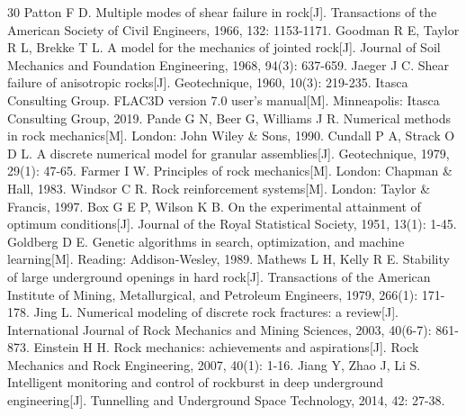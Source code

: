 \documentclass[twocolumn,a4paper,10pt]{article}
\begin{document}
\begin{thebibliography}{30}
 Patton F D. Multiple modes of shear failure in rock[J]. Transactions of the American Society of Civil Engineers, 1966, 132: 1153-1171.
 Goodman R E, Taylor R L, Brekke T L. A model for the mechanics of jointed rock[J]. Journal of Soil Mechanics and Foundation Engineering, 1968, 94(3): 637-659.
 Jaeger J C. Shear failure of anisotropic rocks[J]. Geotechnique, 1960, 10(3): 219-235.
 Itasca Consulting Group. FLAC3D version 7.0 user's manual[M]. Minneapolis: Itasca Consulting Group, 2019.
 Pande G N, Beer G, Williams J R. Numerical methods in rock mechanics[M]. London: John Wiley \& Sons, 1990.
 Cundall P A, Strack O D L. A discrete numerical model for granular assemblies[J]. Geotechnique, 1979, 29(1): 47-65.
 Farmer I W. Principles of rock mechanics[M]. London: Chapman \& Hall, 1983.
 Windsor C R. Rock reinforcement systems[M]. London: Taylor \& Francis, 1997.
 Box G E P, Wilson K B. On the experimental attainment of optimum conditions[J]. Journal of the Royal Statistical Society, 1951, 13(1): 1-45.
 Goldberg D E. Genetic algorithms in search, optimization, and machine learning[M]. Reading: Addison-Wesley, 1989.
 Mathews L H, Kelly R E. Stability of large underground openings in hard rock[J]. Transactions of the American Institute of Mining, Metallurgical, and Petroleum Engineers, 1979, 266(1): 171-178.
 Jing L. Numerical modeling of discrete rock fractures: a review[J]. International Journal of Rock Mechanics and Mining Sciences, 2003, 40(6-7): 861-873.
 Einstein H H. Rock mechanics: achievements and aspirations[J]. Rock Mechanics and Rock Engineering, 2007, 40(1): 1-16.
 Jiang Y, Zhao J, Li S. Intelligent monitoring and control of rockburst in deep underground engineering[J]. Tunnelling and Underground Space Technology, 2014, 42: 27-38.
\end{thebibliography}
\end{document}
